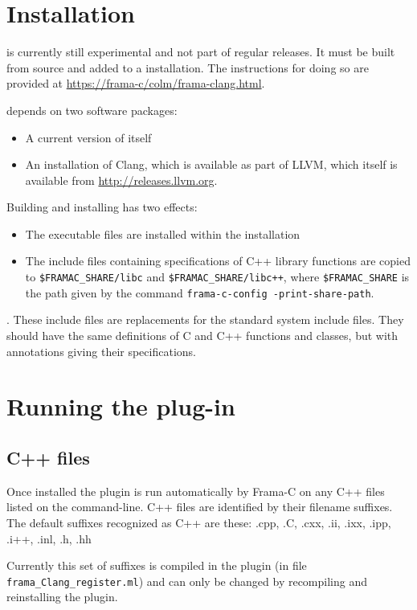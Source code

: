 

\chapter{Installation}

\fclang is currently still experimental and not part of regular \framac releases. It must be built from source and added to a \framac installation.
The instructions for doing so are provided at 
\url{https://frama-c/colm/frama-clang.html}.

\fclang depends on two software packages:
\begin{itemize}
\item A current version of \framac itself
\item An installation of Clang, which is available as part of LLVM,
which itself is available from \url{http://releases.llvm.org}.
\end{itemize}

Building and installing \fclang has two effects:
\begin{itemize}
\item The \fclang executable files are installed within the \framac installation
\item The include files containing \acslpp specifications of C++ library functions
are copied to \verb|$FRAMAC_SHARE/libc| and 
\verb|$FRAMAC_SHARE/libc++|, where \verb|$FRAMAC_SHARE| is the path
given by the command \lstinline|frama-c-config -print-share-path|.
\end{itemize}.
These include files are replacements for the standard system include files.
They should have the same definitions of C and C++ functions and classes, but
with \acslpp annotations giving their specifications.

\chapter{Running the plug-in}

\section{C++ files}
Once installed the plugin is run automatically by Frama-C on any C++ files listed on the command-line. C++ files are identified by their filename suffixes. The default suffixes recognized as C++ are these:
 .cpp, .C, .cxx, .ii, .ixx, .ipp, .i++, .inl, .h, .hh

Currently this set of suffixes is compiled in the plugin (in file \texttt{frama\_Clang\_register.ml}) and can only be changed by recompiling and
reinstalling the plugin.


